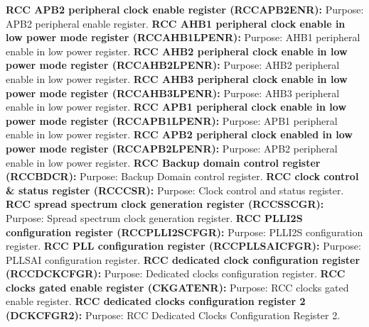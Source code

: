 \documentclass{article}
\begin{document}
\textbf{RCC APB2 peripheral clock enable register (RCC\textunderscore APB2ENR):} Purpose: APB2 peripheral enable register.\newline\newline
\textbf{RCC AHB1 peripheral clock enable in low power mode register (RCC\textunderscore AHB1LPENR):} Purpose: AHB1 peripheral enable in low power register.\newline\newline
\textbf{RCC AHB2 peripheral clock enable in low power mode register (RCC\textunderscore AHB2LPENR):} Purpose: AHB2 peripheral enable in low power register.\newline\newline
\textbf{RCC AHB3 peripheral clock enable in low power mode register (RCC\textunderscore AHB3LPENR):} Purpose: AHB3 peripheral enable in low power register.\newline\newline
\textbf{RCC APB1 peripheral clock enable in low power mode register (RCC\textunderscore APB1LPENR):} Purpose: APB1 peripheral enable in low power register.\newline\newline
\textbf{RCC APB2 peripheral clock enabled in low power mode register (RCC\textunderscore APB2LPENR):} Purpose: APB2 peripheral enable in low power register.\newline\newline
\textbf{RCC Backup domain control register (RCC\textunderscore BDCR):} Purpose: Backup Domain control register.\newline\newline
\textbf{RCC clock control & status register (RCC\textunderscore CSR):} Purpose: Clock control and status register.\newline\newline
\textbf{RCC spread spectrum clock generation register (RCC\textunderscore SSCGR):} Purpose: Spread spectrum clock generation register.\newline\newline
\textbf{RCC PLLI2S configuration register (RCC\textunderscore PLLI2SCFGR):} Purpose: PLLI2S configuration register.\newline\newline
\textbf{RCC PLL configuration register (RCC\textunderscore PLLSAICFGR):} Purpose: PLLSAI configuration register.\newline\newline
\textbf{RCC dedicated clock configuration register (RCC\textunderscore DCKCFGR):} Purpose: Dedicated clocks configuration register.\newline\newline
\textbf{RCC clocks gated enable register (CKGATENR):} Purpose: RCC clocks gated enable register.\newline\newline
\textbf{RCC dedicated clocks configuration register 2 (DCKCFGR2):} Purpose: RCC Dedicated Clocks Configuration Register 2.\newline\newline
\end{document}
